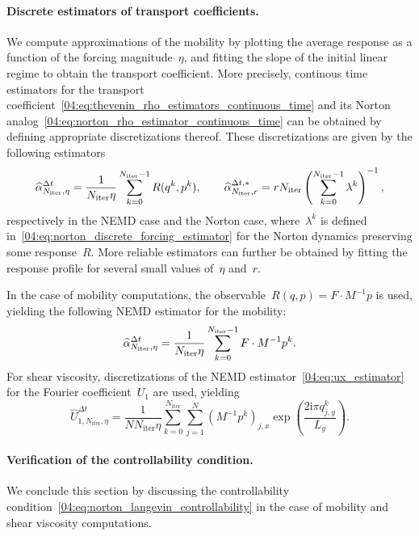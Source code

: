     \paragraph{Discrete estimators of transport coefficients.}
    We compute approximations of the mobility by plotting the average response as a function of the forcing magnitude~$\eta$, and fitting the slope of the initial linear regime to obtain the transport coefficient. More precisely, continous time estimators for the transport coefficient~\eqref{04:eq:thevenin_rho_estimators_continuous_time} and its Norton analog~\eqref{04:eq:norton_rho_estimator_continuous_time} can be obtained by defining appropriate discretizations thereof. These discretizations are given by the following estimators
    \begin{equation}
    \label{04:eq:discr_estimators_ct}
    \widehat{\alpha}^{\Delta t}_{N_{\mathrm{iter}},\eta} = \frac{1}{N_{\mathrm{iter}}\eta}\sum_{k=0}^{N_{\mathrm{iter}}-1}R(q^k,p^k), \qquad  \widehat{\alpha}^{\Delta t,*}_{N_{\mathrm{iter}},r} = r N_{\mathrm{iter}}\left( \sum_{k=0}^{N_{\mathrm{iter}}-1} \lambda^k\right)^{-1},
    \end{equation}
    respectively in the NEMD case and the Norton case, where~$\lambda^k$ is defined in~\eqref{04:eq:norton_discrete_forcing_estimator} for the Norton dynamics preserving some response~$R$. More reliable estimators can further be obtained by fitting the response profile for several small values of~$\eta$ and~$r$.

    In the case of mobility computations, the observable~$R(q,p) = F\cdot M^{-1}p$ is used, yielding the following NEMD estimator for the mobility:
    \begin{equation}
        \widehat{\alpha}^{\Delta t}_{N_{\mathrm{iter}},\eta} = \frac1{N_{\mathrm{iter}}\eta}\sum_{k=0}^{N_{\mathrm{iter}}-1} F\cdot M^{-1}p^k.
    \end{equation}
    For shear viscosity, discretizations of the NEMD estimator~\eqref{04:eq:ux_estimator} for the Fourier coefficient~$U_1$ are used, yielding
    \begin{equation}
        \widehat{U}_{1,N_{\mathrm{iter}},\eta}^{\Delta t} = \frac1{N N_{\mathrm{iter}}\eta}\sum_{k=0}^{N_{\mathrm{iter}}}\sum_{j=1}^{N} \left(M^{-1}p^k\right)_{j,x}\exp\left( \frac{2 \mathrm{i} \pi q^k_{j,y}}{L_y}\right).
    \end{equation}
    
    \paragraph{Verification of the controllability condition.}
    We conclude this section by discussing the controllability condition~\eqref{04:eq:norton_langevin_controllability} in the case of mobility and shear viscosity computations.

